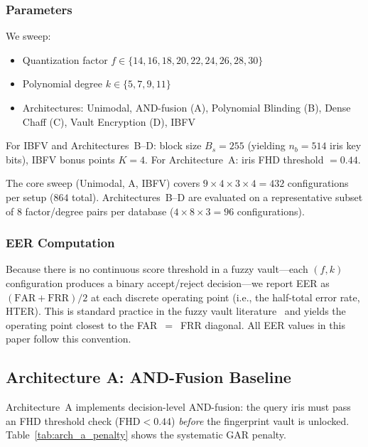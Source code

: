 \documentclass[3p,twocolumn]{elsarticle}
\newcommand{\IBFV}{\textsf{IBFV}}
\newcommand{\FHD}{\mathrm{FHD}}
\begin{document}
\subsubsection{Parameters}
We sweep:
\begin{itemize}
    \item Quantization factor $f \in \{14, 16, 18, 20, 22, 24, 26, 28, 30\}$
    \item Polynomial degree $k \in \{5, 7, 9, 11\}$
    \item Architectures: Unimodal, AND-fusion (A), Polynomial Blinding (B), Dense Chaff (C), Vault Encryption (D), \IBFV{}
\end{itemize}
For \IBFV{} and Architectures~B--D: block size $B_s = 255$ (yielding $n_b = 514$ iris key bits), \IBFV{} bonus points $K = 4$. For Architecture~A: iris FHD threshold $= 0.44$.

The core sweep (Unimodal, A, \IBFV{}) covers $9 \times 4 \times 3 \times 4 = 432$ configurations per setup ($864$ total). Architectures~B--D are evaluated on a representative subset of $8$ factor/degree pairs per database ($4 \times 8 \times 3 = 96$ configurations).

\subsubsection{EER Computation}
\label{sec:eer_computation}
Because there is no continuous score threshold in a fuzzy vault---each $(f, k)$ configuration produces a binary accept/reject decision---we report EER as $(\text{FAR} + \text{FRR})/2$ at each discrete operating point (i.e., the half-total error rate, HTER). This is standard practice in the fuzzy vault literature~\cite{nandakumar2007fuzzy,maurya2025enhancing} and yields the operating point closest to the FAR~$=$~FRR diagonal. All EER values in this paper follow this convention.

\subsection{Architecture A: AND-Fusion Baseline}
\label{sec:arch_a_results}

Architecture~A implements decision-level AND-fusion: the query iris must pass an FHD threshold check ($\FHD < 0.44$) \emph{before} the fingerprint vault is unlocked. Table~\ref{tab:arch_a_penalty} shows the systematic GAR penalty.
\end{document}
